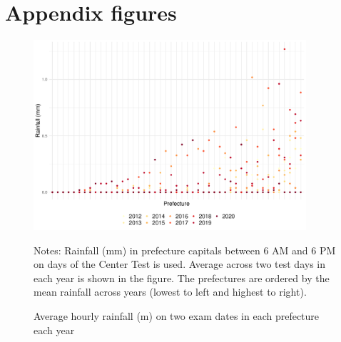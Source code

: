 \documentclass[12pt,letterpaper]{article}
\begin{document}
\setcounter{figure}{0}
\setcounter{table}{0}
\renewcommand\thefigure{\Alph{section}.\arabic{figure}}
\renewcommand\thetable{\Alph{section}.\arabic{table}}
  
\section{Appendix figures}\label{sec:appendix_figure}

\begin{figure}[H]
  \centering
  \caption{Average hourly rainfall (m) on two exam dates in each prefecture each year}
  \includegraphics[width = 0.9\textwidth]{../Output/images/rainfall_diff.pdf}
  \label{fig:rainfall_diff}
  \footnotesize
  \begin{tablenotes}
    \item Notes:
      Rainfall (mm) in prefecture capitals between 6 AM and 6 PM on days of the Center Test is used.
      Average across two test days in each year is shown in the figure.
      The prefectures are ordered by the mean rainfall across years (lowest to left and highest to right).
  \end{tablenotes}
\end{figure}
\end{document}
